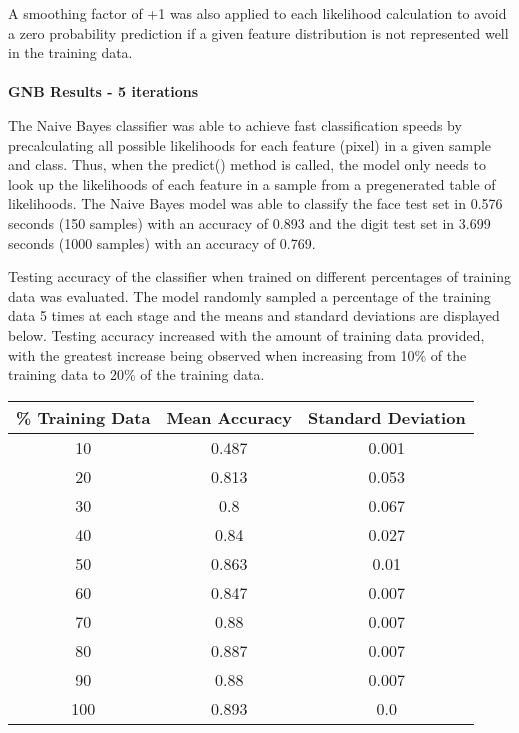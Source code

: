 \documentclass[11pt]{article}
\begin{document}
    A smoothing factor of +1 was also applied to each likelihood calculation to avoid a zero probability prediction if a given feature distribution is not represented well in the training data.\\\\
    \large
    \textbf{GNB Results - 5 iterations}
    \normalsize

    The Naive Bayes classifier was able to achieve fast classification speeds by precalculating all possible likelihoods for each feature (pixel) in a given sample and class. Thus, when the predict() method is called, the model only needs to look up the likelihoods of each feature in a sample from a pregenerated table of likelihoods. The Naive Bayes model was able to classify the face test set in 0.576 seconds (150 samples) with an accuracy of 0.893 and the digit test set in 3.699 seconds (1000 samples) with an accuracy of 0.769.

    Testing accuracy of the classifier when trained on different percentages of training data was evaluated. The model randomly sampled a percentage of the training data 5 times at each stage and the means and standard deviations are displayed below. Testing accuracy increased with the amount of training data provided, with the greatest increase being observed when increasing from 10\% of the training data to 20\% of the training data.

    \begin{center}
    \begin{tabular}{||c c c||}
     \hline
     \% Training Data & Mean Accuracy & Standard Deviation \\ [0.5ex]
     \hline\hline
     10 & 0.487 & 0.001 \\
     \hline
     20 & 0.813 & 0.053 \\
     \hline
     30 & 0.8 & 0.067 \\
     \hline
     40 & 0.84 & 0.027 \\
     \hline
     50 & 0.863 & 0.01 \\
     \hline
     60 & 0.847 & 0.007 \\
     \hline
     70 & 0.88 & 0.007 \\
     \hline
     80 & 0.887 & 0.007 \\
     \hline
     90 & 0.88 & 0.007 \\
     \hline
     100 & 0.893 & 0.0 \\
     \hline
    \end{tabular}
    \end{center}
\end{document}
